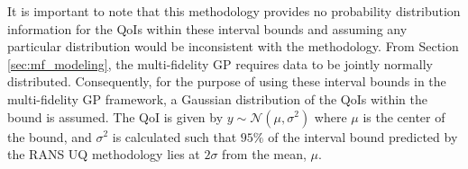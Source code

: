 It is important to note that this methodology provides no probability distribution information for the QoIs within these interval bounds and assuming any particular distribution would be inconsistent with the methodology. From Section \ref{sec:mf_modeling}, the multi-fidelity GP requires data to be jointly normally distributed. Consequently, for the purpose of using these interval bounds in the multi-fidelity GP framework, a Gaussian distribution of the QoIs within the bound is assumed. The QoI is given by $y \sim \mathcal{N}(\mu,\sigma^2)$ where $\mu$ is the center of the bound, and $\sigma^2$ is calculated such that $95\%$ of the interval bound predicted by the RANS UQ methodology lies at $2\sigma$ from the mean, $\mu$.